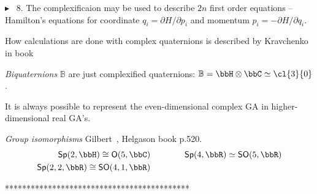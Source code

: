 \begin{example} $\blacktriangleright$ \ex~8. The complexificaion may
be used to describe  $2n$ first order equations -- Hamilton's
equations for coordinate $q_i=\partial H/\partial p_i$ and
momentum $p_i=-\partial H/\partial q_i$.

How calculations are done  with complex quaternions is described
by Kravchenko in book~\cite{Kravchenko03}

 \vspace{5mm}\noindent \textit{Biquaternions} $\mathbb{B}$
are just complexified quaternions:
$\mathbb{B}=\bbH\otimes\bbC\simeq\cl{3}{0}$.


It is always possible to represent the even-dimensional complex GA
in higher-dimensional real GA's.

\begin{unit}
\textit{Group isomorphisms} Gilbert~\cite{Gilbert91}, Helgason
book p.520.
\[\begin{split}
\mathsf{Sp}(2,\bbH)\cong\mathsf{O}(5,\bbC)&\qquad\qquad
\mathsf{Sp}(4,\bbR)\simeq \mathsf{SO}(5,\bbR)\\
\mathsf{Sp}(2,2,\bbR)\cong\mathsf{SO}(4,1,\bbR)&\qquad\qquad\\
\end{split}\]
\end{unit}

\begin{example}
*******************************************


\end{example}
\end{example}
